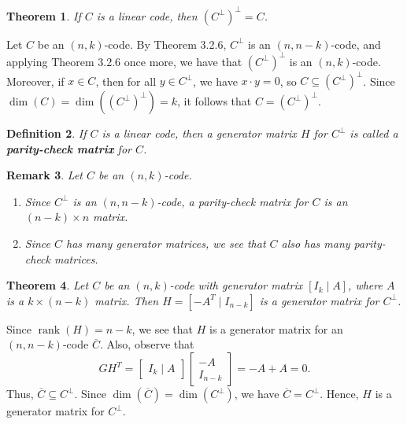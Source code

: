 \documentclass[10pt]{article}
\makeatletter
\DeclareMathOperator{\rank}{rank}
\theoremstyle{newstyle}
\newtheorem{thm}{Theorem}[subsection]
\newtheorem{remark}[thm]{Remark}
\newtheorem{defn}[thm]{Definition}
\newenvironment{pf}[1][\proofname]{\par
  \pushQED{\qed}%
  \normalfont \topsep0\p@\relax
  \trivlist
  \item[\hskip\labelsep\scshape
  #1\@addpunct{.}]\ignorespaces
}{%
  \popQED\endtrivlist\@endpefalse
}
\makeatother
\begin{document}
\begin{thm}
If $C$ is a linear code, then $(C^\perp)^\perp = C$. 
\end{thm}
\begin{pf}
Let $C$ be an $(n, k)$-code. By Theorem 3.2.6, $C^\perp$ is an $(n, n-k)$-code, 
and applying Theorem 3.2.6 once more, we have that $(C^\perp)^\perp$ is an $(n, k)$-code. 
Moreover, if $x \in C$, then for all $y \in C^\perp$, we have $x \cdot y = 0$, so 
$C \subseteq (C^\perp)^\perp$. Since $\dim(C) = \dim((C^\perp)^\perp) = k$, it follows that 
$C = (C^\perp)^\perp$. 
\end{pf}

\begin{defn}
If $C$ is a linear code, then a generator matrix $H$ for $C^\perp$ is called a 
{\bf parity-check matrix} for $C$. 
\end{defn}

\begin{remark}
Let $C$ be an $(n, k)$-code.
\begin{enumerate}[(1)]
    \item Since $C^\perp$ is an $(n, n-k)$-code, a parity-check matrix for $C$ is an 
    $(n-k)\times n$ matrix. 
    \item Since $C$ has many generator matrices, we see that $C$ also has many parity-check matrices. 
\end{enumerate}
\end{remark}

\begin{thm}
Let $C$ be an $(n, k)$-code with generator matrix $[I_k \mid A]$, where $A$ is a 
$k \times (n-k)$ matrix. Then $H = [-A^T \mid I_{n-k}]$ is a generator matrix for 
$C^\perp$. 
\end{thm}
\begin{pf}
Since $\rank(H) = n-k$, we see that $H$ is a generator matrix for an $(n, n-k)$-code $\overline{C}$. 
Also, observe that 
\[ GH^T = \begin{bmatrix} I_k \mid A \end{bmatrix} 
\left[
\begin{array}{c}
-A \\
\hline
I_{n-k}
\end{array}
\right] = 
-A + A = 0. \]
Thus, $\overline{C} \subseteq C^\perp$. Since $\dim(\overline{C}) = \dim(C^\perp)$, 
we have $\overline{C} = C^\perp$. Hence, $H$ is a generator matrix for $C^\perp$. 
\end{pf}
\end{document}
